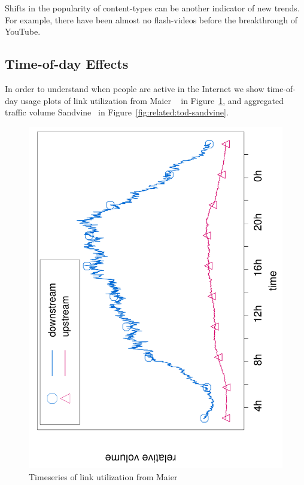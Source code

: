 Shifts in the popularity of content-types can be another indicator of new
trends. For example, there have been almost no flash-videos before the
breakthrough of YouTube.



\subsection{Time-of-day Effects}\label{sec:related:tod}

In order to understand when people are active in the Internet we show
time-of-day usage plots of link utilization from Maier
\etal~\cite{OnDominantCharacteristics2009} in
Figure~\ref{fig:related:tod-maier}, and aggregated traffic volume
Sandvine~\cite{sandvine} in Figure~\ref{fig:related:tod-sandvine}.

\begin{figure}[tbp]
\centering
\includegraphics[angle=-90,width=0.85\linewidth]{figures-pdf/maier-tod}
\renewcommand{\capname}{Timeseries of link utilization from Maier \etal}
\caption[\capname]{\capname~\cite{OnDominantCharacteristics2009}}
\label{fig:related:tod-maier}
\end{figure}



